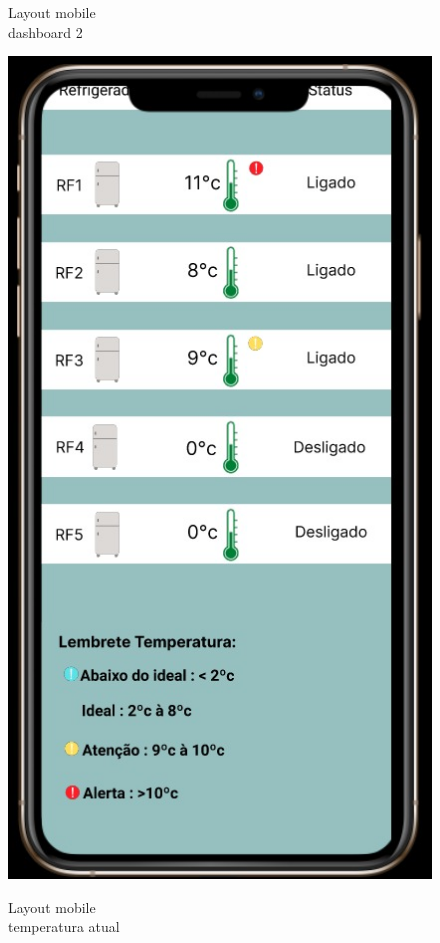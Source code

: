     \begin{figure}
        \centering
        \begin{minipage}{0.5\textwidth}
            \caption{Layout mobile \\ dashboard 2}
            \centering
            \includegraphics[height=0.4\textheight]{img/mobile/dashboard_2.jpeg}
            \label{fig:mobileDashboard2}
        \end{minipage}%
        \begin{minipage}{0.5\textwidth}
            \caption{Layout mobile \\ temperatura atual}

\end{minipage}
\end{figure}
